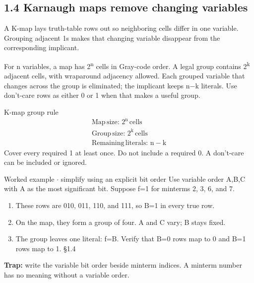 \documentclass[11pt]{article}
\begin{document}
\begin{keepsection}
\section{1.4 Karnaugh maps remove changing variables}

A K-map lays truth-table rows out so neighboring cells differ in one variable. Grouping adjacent 1s makes that changing variable disappear from the corresponding implicant.

For n variables, a map has 2\textsuperscript{n} cells in Gray-code order. A legal group contains 2\textsuperscript{k} adjacent cells, with wraparound adjacency allowed. Each grouped variable that changes across the group is eliminated; the implicant keeps n\ensuremath{-}k literals. Use don’t-care rows as either 0 or 1 when that makes a useful group.

\begin{equationcard}{K-map group rule}
\[ \begin{gathered} \text{Map}\, \text{size}:\, 2^{\mathrm{n}}\, \text{cells} \\ \text{Group}\, \text{size}:\, 2^{\mathrm{k}}\, \text{cells} \\ \text{Remaining}\, \text{literals}:\, \mathrm{n}-\mathrm{k} \end{gathered} \]
{\small Cover every required 1 at least once. Do not include a required 0. A don’t-care can be included or ignored.}
\end{equationcard}

\begin{workedbox}{Worked example \ensuremath{\cdot} simplify using an explicit bit order}
Use variable order A,B,C with A as the most significant bit. Suppose f=1 for minterms 2, 3, 6, and 7.

\begin{enumerate}
\item These rows are 010, 011, 110, and 111, so B=1 in every true row.
\item On the map, they form a group of four. A and C vary; B stays fixed.
\item The group leaves one literal: f=B. Verify that B=0 rows map to 0 and B=1 rows map to 1. \hfill{\small\color{FAUblue}§1.4}
\end{enumerate}
\end{workedbox}

\begin{notebox}\textbf{Trap:} write the variable bit order beside minterm indices. A minterm number has no meaning without a variable order.\end{notebox}


\end{keepsection}
\end{document}
